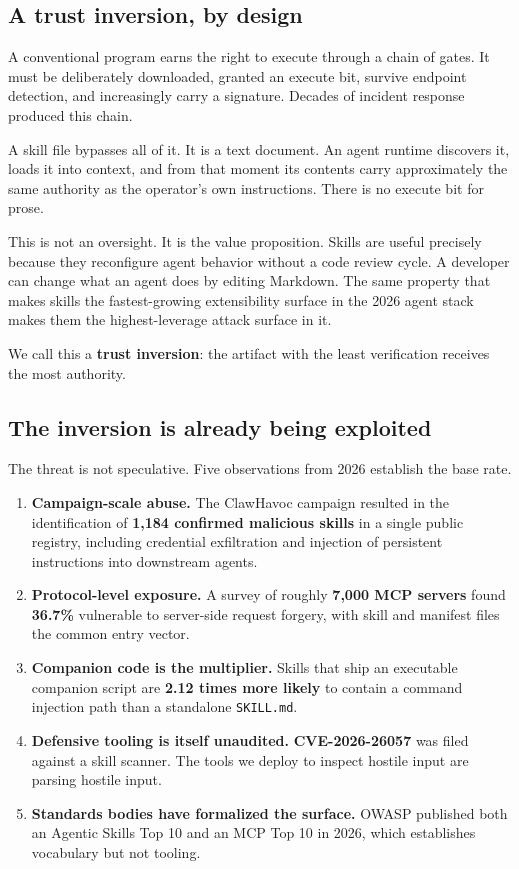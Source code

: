 \documentclass[11pt]{article}
\begin{document}
\subsection{A trust inversion, by design}

A conventional program earns the right to execute through a chain of gates. It
must be deliberately downloaded, granted an execute bit, survive endpoint
detection, and increasingly carry a signature. Decades of incident response
produced this chain.

A skill file bypasses all of it. It is a text document. An agent runtime
discovers it, loads it into context, and from that moment its contents carry
approximately the same authority as the operator's own instructions. There is
no execute bit for prose.

This is not an oversight. It is the value proposition. Skills are useful
precisely because they reconfigure agent behavior without a code review cycle.
A developer can change what an agent does by editing Markdown. The same
property that makes skills the fastest-growing extensibility surface in the
2026 agent stack makes them the highest-leverage attack surface in it.

We call this a \textbf{trust inversion}: the artifact with the least
verification receives the most authority.

\subsection{The inversion is already being exploited}

The threat is not speculative. Five observations from 2026 establish the base
rate.

\begin{enumerate}[leftmargin=*,itemsep=2pt]
  \item \textbf{Campaign-scale abuse.} The ClawHavoc campaign resulted in the
  identification of \textbf{1{,}184 confirmed malicious skills} in a single
  public registry, including credential exfiltration and injection of
  persistent instructions into downstream agents.
  \item \textbf{Protocol-level exposure.} A survey of roughly \textbf{7{,}000
  MCP servers} found \textbf{36.7\%} vulnerable to server-side request forgery,
  with skill and manifest files the common entry vector.
  \item \textbf{Companion code is the multiplier.} Skills that ship an
  executable companion script are \textbf{2.12 times more likely} to contain a
  command injection path than a standalone \texttt{SKILL.md}.
  \item \textbf{Defensive tooling is itself unaudited.} \textbf{CVE-2026-26057}
  was filed against a skill scanner. The tools we deploy to inspect hostile
  input are parsing hostile input.
  \item \textbf{Standards bodies have formalized the surface.} OWASP published
  both an Agentic Skills Top 10 and an MCP Top 10 in 2026, which establishes
  vocabulary but not tooling.
\end{enumerate}
\end{document}
